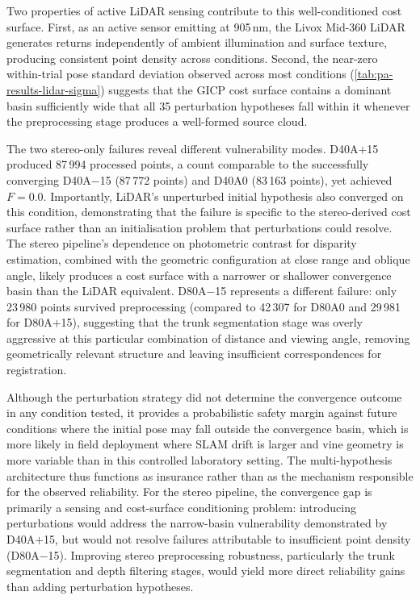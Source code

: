 Two properties of active LiDAR sensing contribute to this well-conditioned cost surface. First, as an active sensor emitting at 905\,nm, the Livox Mid-360 LiDAR generates returns independently of ambient illumination and surface texture, producing consistent point density across conditions. Second, the near-zero within-trial pose standard deviation observed across most conditions (\cref{tab:pa-results-lidar-sigma}) suggests that the GICP cost surface contains a dominant basin sufficiently wide that all 35 perturbation hypotheses fall within it whenever the preprocessing stage produces a well-formed source cloud.

The two stereo-only failures reveal different vulnerability modes. D40A$+$15 produced 87\,994 processed points, a count comparable to the successfully converging D40A$-$15 (87\,772 points) and D40A0 (83\,163 points), yet achieved $F = 0.0$. Importantly, LiDAR's unperturbed initial hypothesis also converged on this condition, demonstrating that the failure is specific to the stereo-derived cost surface rather than an initialisation problem that perturbations could resolve. The stereo pipeline's dependence on photometric contrast for disparity estimation, combined with the geometric configuration at close range and oblique angle, likely produces a cost surface with a narrower or shallower convergence basin than the LiDAR equivalent. D80A$-$15 represents a different failure: only 23\,980 points survived preprocessing (compared to 42\,307 for D80A0 and 29\,981 for D80A$+$15), suggesting that the trunk segmentation stage was overly aggressive at this particular combination of distance and viewing angle, removing geometrically relevant structure and leaving insufficient correspondences for registration.

Although the perturbation strategy did not determine the convergence outcome in any condition tested, it provides a probabilistic safety margin against future conditions where the initial pose may fall outside the convergence basin, which is more likely in field deployment where SLAM drift is larger and vine geometry is more variable than in this controlled laboratory setting. The multi-hypothesis architecture thus functions as insurance rather than as the mechanism responsible for the observed reliability. For the stereo pipeline, the convergence gap is primarily a sensing and cost-surface conditioning problem: introducing perturbations would address the narrow-basin vulnerability demonstrated by D40A$+$15, but would not resolve failures attributable to insufficient point density (D80A$-$15). Improving stereo preprocessing robustness, particularly the trunk segmentation and depth filtering stages, would yield more direct reliability gains than adding perturbation hypotheses.

